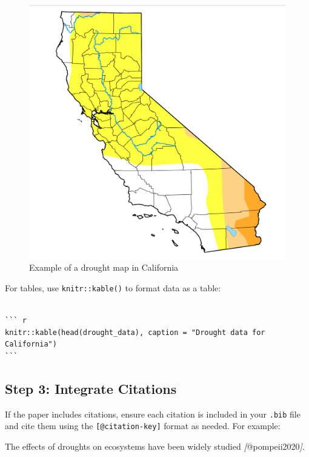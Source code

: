 \documentclass[
]{book}
\newenvironment{Shaded}{\begin{snugshade}}{\end{snugshade}}
\newcommand{\CommentTok}[1]{\textcolor[rgb]{0.56,0.35,0.01}{\textit{#1}}}
\newcommand{\NormalTok}[1]{#1}
\newcommand{\OtherTok}[1]{\textcolor[rgb]{0.56,0.35,0.01}{#1}}
\theoremstyle{definition}
\theoremstyle{definition}
\theoremstyle{definition}
\theoremstyle{definition}
\theoremstyle{remark}
\begin{document}
\begin{figure}
\centering
\includegraphics{images/drought-map.png}
\caption{\label{fig:unnamed-chunk-7}Example of a drought map in California}
\end{figure}

For tables, use \texttt{knitr::kable()} to format data as a table:

\begin{verbatim}

``` r
knitr::kable(head(drought_data), caption = "Drought data for California")
```
\end{verbatim}

\subsection{Step 3: Integrate Citations}\label{step-3-integrate-citations}

If the paper includes citations, ensure each citation is included in your \texttt{.bib} file and cite them using the \texttt{{[}@citation-key{]}} format as needed. For example:

\begin{Shaded}
\begin{Highlighting}[]
\NormalTok{The effects of droughts on ecosystems have been widely studied }\CommentTok{[}\OtherTok{@pompeii2020}\CommentTok{]}\NormalTok{.}
\end{Highlighting}
\end{Shaded}
\end{document}
